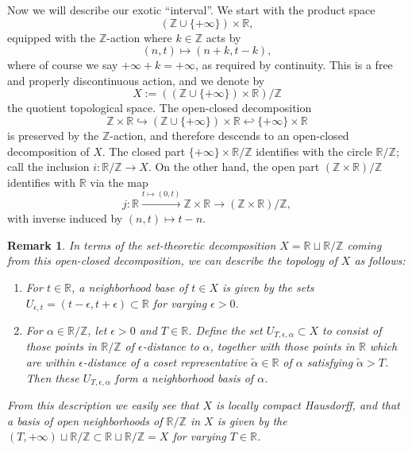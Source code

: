 \documentclass[12pt]{article}
\newtheorem{remark}[theorem]{Remark}
\begin{document}
Now we will describe our exotic ``interval''.  We start with the product space
$$(\mathbb{Z}\cup\{+\infty\})\times \mathbb{R},$$
equipped with the $\mathbb{Z}$-action where $k\in\mathbb{Z}$ acts by
$$(n,t) \mapsto (n+k,t-k),$$
where of course we say $+\infty+k=+\infty$, as required by continuity.  This is a free and properly discontinuous action, and we denote by
$$X:=\left((\mathbb{Z}\cup\{+\infty\})\times \mathbb{R}\right)/\mathbb{Z}$$
the quotient topological space.  The open-closed decomposition 
$$\mathbb{Z}\times\mathbb{R}\hookrightarrow (\mathbb{Z}\cup\{+\infty\})\times \mathbb{R} \hookleftarrow \{+\infty\}\times \mathbb{R}$$
is preserved by the $\mathbb{Z}$-action, and therefore descends to an open-closed decomposition of $X$.  The closed part $\{+\infty\}\times \mathbb{R}/\mathbb{Z}$ identifies with the circle $\mathbb{R}/\mathbb{Z}$; call the inclusion $i:\mathbb{R}/\mathbb{Z}\rightarrow X$.  On the other hand, the open part $(\mathbb{Z}\times\mathbb{R})/\mathbb{Z}$ identifies with $\mathbb{R}$ via the map
$$j:\mathbb{R}\overset{t\mapsto (0,t)}{\longrightarrow} \mathbb{Z}\times\mathbb{R}\rightarrow (\mathbb{Z}\times\mathbb{R})/\mathbb{Z},$$
with inverse induced by $(n,t)\mapsto t-n$.

\begin{remark}
In terms of the set-theoretic decomposition $X=\mathbb{R}\sqcup\mathbb{R}/\mathbb{Z}$ coming from this open-closed decomposition, we can describe the topology of $X$ as follows:
\begin{enumerate}
\item For $t\in\mathbb{R}$, a neighborhood base of $t\in X$ is given by the sets $U_{\epsilon,t}=(t-\epsilon,t+\epsilon)\subset\mathbb{R}$ for varying $\epsilon>0$.
\item For $\alpha\in\mathbb{R}/\mathbb{Z}$, let $\epsilon>0$ and $T\in\mathbb{R}$.  Define the set $U_{T,\epsilon,\alpha}\subset X$ to consist of those points in $\mathbb{R}/\mathbb{Z}$ of $\epsilon$-distance to $\alpha$, together with those points in $\mathbb{R}$  which are within $\epsilon$-distance of a coset representative $\widetilde{\alpha}\in\mathbb{R}$ of $\alpha$ satisfying $\widetilde{\alpha}>T$.  Then these $U_{T,\epsilon,\alpha}$ form a neighborhood basis of $\alpha$.
\end{enumerate}
From this description we easily see that $X$ is locally compact Hausdorff, and that a basis of open neighborhoods of $\mathbb{R}/\mathbb{Z}$ in $X$ is given by the $(T,+\infty)\sqcup \mathbb{R}/\mathbb{Z} \subset \mathbb{R}\sqcup\mathbb{R}/\mathbb{Z}=X$ for varying $T\in\mathbb{R}$.
\end{remark}
\end{document}
